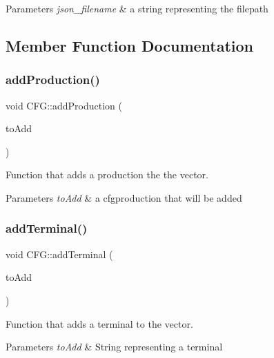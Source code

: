 \begin{DoxyParams}{Parameters}
{\em json\+\_\+filename} & a string representing the filepath \\
\hline
\end{DoxyParams}


\subsection{Member Function Documentation}
\mbox{\label{classCFG_abcb544cc6860ae5c3c6c53df8a6de848}} 
\subsubsection{\texorpdfstring{add\+Production()}{addProduction()}}
{\footnotesize\ttfamily void C\+F\+G\+::add\+Production (\begin{DoxyParamCaption}\item[{const \hyperlink{classCFGProduction}{C\+F\+G\+Production} \&}]{to\+Add }\end{DoxyParamCaption})}



Function that adds a production the the vector. 


\begin{DoxyParams}{Parameters}
{\em to\+Add} & a cfgproduction that will be added \\
\hline
\end{DoxyParams}
\mbox{\label{classCFG_a53fb7ce08819bddc840bfc47ca5fd6d3}} 
\subsubsection{\texorpdfstring{add\+Terminal()}{addTerminal()}}
{\footnotesize\ttfamily void C\+F\+G\+::add\+Terminal (\begin{DoxyParamCaption}\item[{const std\+::string \&}]{to\+Add }\end{DoxyParamCaption})}



Function that adds a terminal to the vector. 


\begin{DoxyParams}{Parameters}
{\em to\+Add} & String representing a terminal \\
\hline
\end{DoxyParams}
\mbox{\label{classCFG_a1e6cdb62d1098d571e885f5664ab4eaa}} 
